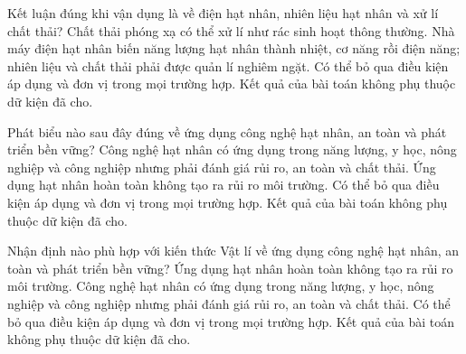 \begin{ex}
Kết luận đúng khi vận dụng là về điện hạt nhân, nhiên liệu hạt nhân và xử lí chất thải?
\choice
{Chất thải phóng xạ có thể xử lí như rác sinh hoạt thông thường.}
{\True Nhà máy điện hạt nhân biến năng lượng hạt nhân thành nhiệt, cơ năng rồi điện năng; nhiên liệu và chất thải phải được quản lí nghiêm ngặt.}
{Có thể bỏ qua điều kiện áp dụng và đơn vị trong mọi trường hợp.}
{Kết quả của bài toán không phụ thuộc dữ kiện đã cho.}
\end{ex}

\begin{ex}
Phát biểu nào sau đây đúng về ứng dụng công nghệ hạt nhân, an toàn và phát triển bền vững?
\choice
{\True Công nghệ hạt nhân có ứng dụng trong năng lượng, y học, nông nghiệp và công nghiệp nhưng phải đánh giá rủi ro, an toàn và chất thải.}
{Ứng dụng hạt nhân hoàn toàn không tạo ra rủi ro môi trường.}
{Có thể bỏ qua điều kiện áp dụng và đơn vị trong mọi trường hợp.}
{Kết quả của bài toán không phụ thuộc dữ kiện đã cho.}
\end{ex}

\begin{ex}
Nhận định nào phù hợp với kiến thức Vật lí về ứng dụng công nghệ hạt nhân, an toàn và phát triển bền vững?
\choice
{Ứng dụng hạt nhân hoàn toàn không tạo ra rủi ro môi trường.}
{\True Công nghệ hạt nhân có ứng dụng trong năng lượng, y học, nông nghiệp và công nghiệp nhưng phải đánh giá rủi ro, an toàn và chất thải.}
{Có thể bỏ qua điều kiện áp dụng và đơn vị trong mọi trường hợp.}
{Kết quả của bài toán không phụ thuộc dữ kiện đã cho.}
\end{ex}

